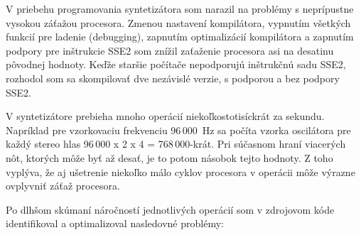 V priebehu programovania syntetizátora som narazil na problémy s neprípustne vysokou záťažou procesora. Zmenou nastavení kompilátora, vypnutím všetkých funkcií pre ladenie (debugging), zapnutím optimalizácií kompilátora a zapnutím podpory pre inštrukcie SSE2 som znížil zaťaženie procesora asi na desatinu pôvodnej hodnoty. Keďže staršie počítače nepodporujú inštrukčnú sadu SSE2, rozhodol som sa skompilovať dve nezávislé verzie, s podporou a bez podpory SSE2.

V syntetizátore prebieha mnoho operácií niekoľkostotisíckrát za sekundu. Napríklad pre vzorkovaciu frekvenciu 96\,000~Hz sa počíta vzorka oscilátora pre každý stereo hlas 96\,000 x 2 x 4 = 768\,000-krát. Pri súčasnom hraní viacerých nôt, ktorých môže byť až desať, je to potom násobok tejto hodnoty. Z toho vyplýva, že aj ušetrenie niekoľko málo cyklov procesora v operácii môže výrazne ovplyvniť záťaž procesora.

Po dlhšom skúmaní náročností jednotlivých operácií \cite{b07} som v zdrojovom kóde identifikoval a optimalizoval nasledovné problémy:

